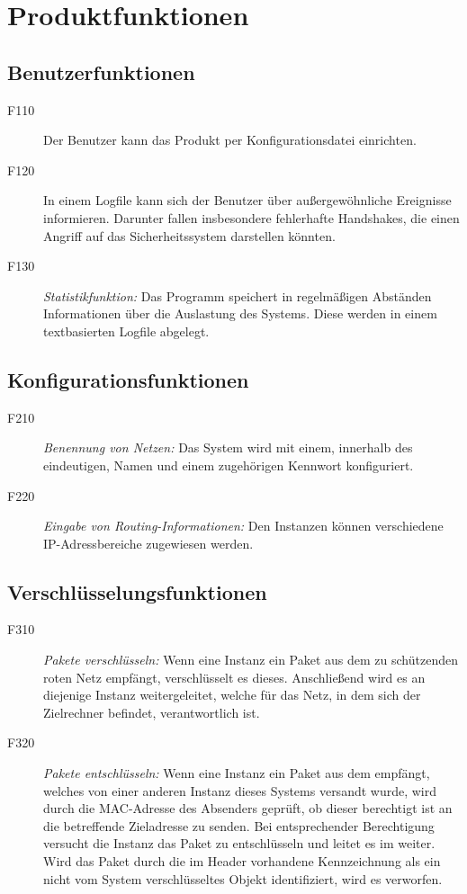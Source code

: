 \section{Produktfunktionen}

\subsection{Benutzerfunktionen}
	\begin{description}
		\item[F110] Der Benutzer kann das Produkt per Konfigurationsdatei einrichten.	
		\item[F120] In einem Logfile kann sich der Benutzer über außergewöhnliche Ereignisse informieren. 
		Darunter fallen insbesondere fehlerhafte Handshakes, die einen Angriff auf das Sicherheitssystem darstellen könnten.
		\item[F130] \textit{Statistikfunktion:} Das Programm speichert in regelmäßigen Abständen Informationen über die Auslastung des Systems. 
		Diese werden in einem textbasierten Logfile abgelegt.
	\end{description}	

\subsection{Konfigurationsfunktionen}
	\begin{description}
		\item[F210] \textit{Benennung von Netzen:} Das System wird mit einem, innerhalb des  eindeutigen, Namen und einem zugehörigen Kennwort konfiguriert.
		\item[F220] \textit{Eingabe von Routing-Informationen:} Den Instanzen können verschiedene IP-Adressbereiche zugewiesen werden.
	\end{description}

\subsection{Verschlüsselungsfunktionen}
	\begin{description}
		\item[F310] \textit{Pakete verschlüsseln:} Wenn eine Instanz ein Paket aus dem zu schützenden roten Netz empfängt, verschlüsselt es dieses. Anschließend wird es an diejenige Instanz weitergeleitet, welche für das Netz, in dem sich der Zielrechner befindet, verantwortlich ist.
		\item[F320]	\textit{Pakete entschlüsseln:} Wenn eine Instanz ein Paket aus dem  empfängt, welches von einer anderen Instanz dieses Systems versandt wurde, wird durch die MAC-Adresse des Absenders geprüft, ob dieser berechtigt ist an die betreffende Zieladresse zu senden. Bei entsprechender Berechtigung versucht die Instanz das Paket zu entschlüsseln und leitet es im  weiter.
		Wird das Paket durch die im Header vorhandene Kennzeichnung als ein nicht vom System verschlüsseltes Objekt identifiziert, wird es verworfen.
	\end{description}

